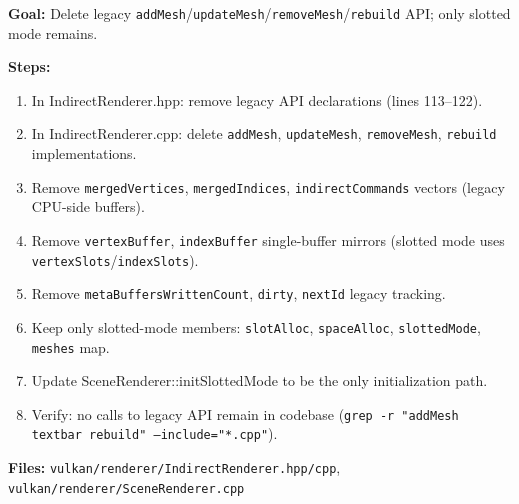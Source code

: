 \documentclass[11pt,a4paper]{article}
\begin{document}
\begin{tcolorbox}[promptbox={Prompt: Remove Legacy Append Mode (Rebuild Path)}]
\textbf{Goal:} Delete legacy \texttt{addMesh}/\texttt{updateMesh}/\texttt{removeMesh}/\texttt{rebuild} API; only slotted mode remains.

\textbf{Steps:}
\begin{enumerate}
    \item In IndirectRenderer.hpp: remove legacy API declarations (lines 113–122).
    \item In IndirectRenderer.cpp: delete \texttt{addMesh}, \texttt{updateMesh}, \texttt{removeMesh}, \texttt{rebuild} implementations.
    \item Remove \texttt{mergedVertices}, \texttt{mergedIndices}, \texttt{indirectCommands} vectors (legacy CPU-side buffers).
    \item Remove \texttt{vertexBuffer}, \texttt{indexBuffer} single-buffer mirrors (slotted mode uses \texttt{vertexSlots}/\texttt{indexSlots}).
    \item Remove \texttt{metaBuffersWrittenCount}, \texttt{dirty}, \texttt{nextId} legacy tracking.
    \item Keep only slotted-mode members: \texttt{slotAlloc}, \texttt{spaceAlloc}, \texttt{slottedMode}, \texttt{meshes} map.
    \item Update SceneRenderer::initSlottedMode to be the only initialization path.
    \item Verify: no calls to legacy API remain in codebase (\texttt{grep -r "addMesh\\textbar rebuild" --include="*.cpp"}).
\end{enumerate}

\textbf{Files:} \texttt{vulkan/renderer/IndirectRenderer.hpp/cpp}, \texttt{vulkan/renderer/SceneRenderer.cpp}
\end{tcolorbox}
\end{document}
